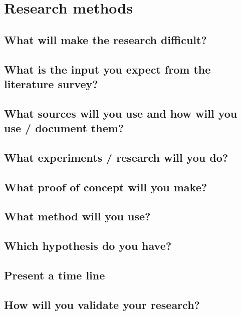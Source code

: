 \chapter{Research methods}

\lipsum[6]

\section[Difficulties]{What will make the research difficult?}
\lipsum[7]

\section[Literature input]{What is the input you expect from the literature survey?}
\lipsum[8]

\section[Information sources]{What sources will you use and how will you use / document them?}
\lipsum[9]

\section[Experiments]{What experiments / research will you do?}
\lipsum[10]

\section[Proof of concept]{What proof of concept will you make?}
\lipsum[11]

\section[Methods]{What method will you use?}
\lipsum[12]

\section[Hypotheses]{Which hypothesis do you have?}
\lipsum[13]

\section[Timeline]{Present a time line}
\lipsum[14]

\section[Validation]{How will you validate your research?}
\lipsum[15]
